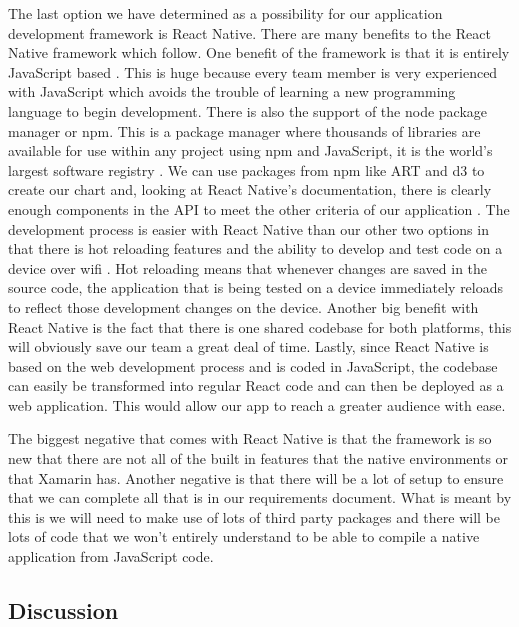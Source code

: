 \documentclass[onecolumn, draftclsnofoot,10pt, compsoc]{IEEEtran}
\begin{document}
The last option we have determined as a possibility for our application development framework is React Native.
There are many benefits to the React Native framework which follow.
One benefit of the framework is that it is entirely JavaScript based \cite{reactnative}.
This is huge because every team member is very experienced with JavaScript which avoids the trouble of learning a new programming language to begin development.
There is also the support of the node package manager or npm.
This is a package manager where thousands of libraries are available for use within any project using npm and JavaScript, it is the world's largest software registry \cite{npm}.
We can use packages from npm like ART and d3 to create our chart and, looking at React Native's documentation, there is clearly enough components in the API to meet the other criteria of our application \cite{rndocs}.
The development process is easier with React Native than our other two options in that there is hot reloading features and the ability to develop and test code on a device over wifi \cite{reactnative}.
Hot reloading means that whenever changes are saved in the source code, the application that is being tested on a device immediately reloads to reflect those development changes on the device.
Another big benefit with React Native is the fact that there is one shared codebase for both platforms, this will obviously save our team a great deal of time.
Lastly, since React Native is based on the web development process and is coded in JavaScript, the codebase can easily be transformed into regular React code and can then be deployed as a web application.
This would allow our app to reach a greater audience with ease.

The biggest negative that comes with React Native is that the framework is so new that there are not all of the built in features that the native environments or that Xamarin has.
Another negative is that there will be a lot of setup to ensure that we can complete all that is in our requirements document.
What is meant by this is we will need to make use of lots of third party packages and there will be lots of code that we won't entirely understand to be able to compile a native application from JavaScript code.

\subsection{Discussion}
\end{document}
